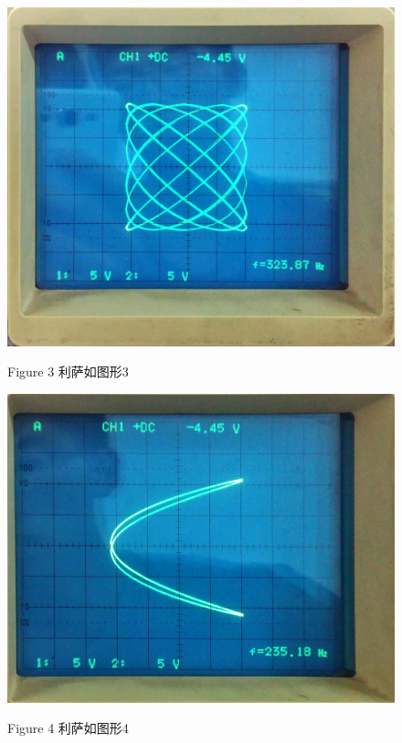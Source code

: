 \documentclass[a4paper,10pt,notitlepage]{report}
\begin{document}
\begin{figure}[htbp]
\centering

	\includegraphics[scale=.1]{L03.jpg}
	\begin{center}
		\scriptsize Figure 3 利萨如图形3
	\end{center}

\end{figure}
	
\begin{figure}[htbp]
\centering

	\includegraphics[scale=.13]{L04.jpg}
	\begin{center}
		\scriptsize Figure 4 利萨如图形4
	\end{center}

\end{figure}
	
\end{document}
